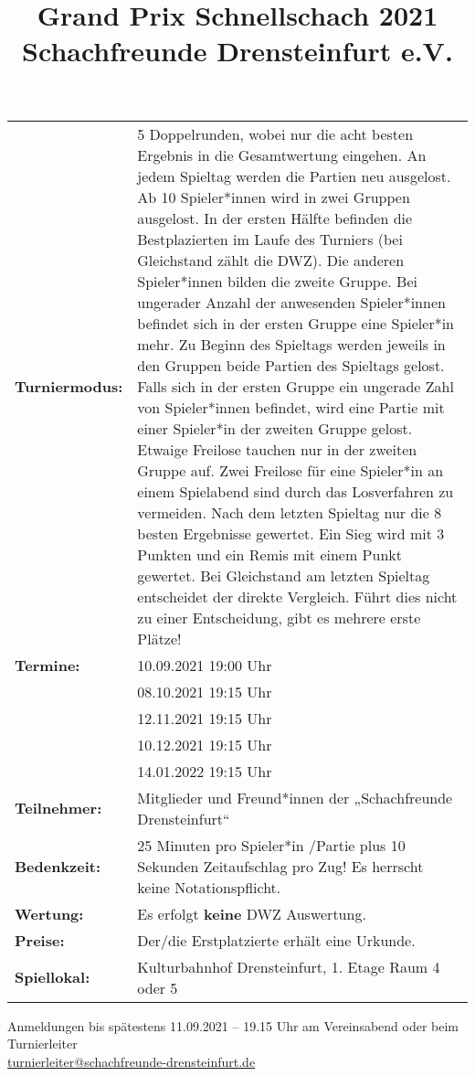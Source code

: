 \documentclass[a4paper,parskip=full-,DIV18]{scrartcl}
\title{Grand Prix Schnellschach 2021 \\Schachfreunde Drensteinfurt e.V.}
\date{}
\begin{document}
\maketitle


\begin{tabular}{p{3 cm} p{13.5 cm}}
	\textbf{Turniermodus:} & 5 Doppelrunden, wobei nur die acht besten Ergebnis in die Gesamtwertung eingehen. An jedem Spieltag werden die Partien neu ausgelost. Ab 10 Spieler*innen wird in zwei Gruppen ausgelost. In der ersten Hälfte befinden die Bestplazierten im Laufe des Turniers (bei Gleichstand zählt die DWZ). Die anderen Spieler*innen bilden die zweite Gruppe. Bei ungerader Anzahl der anwesenden Spieler*innen befindet sich in der ersten Gruppe eine Spieler*in mehr. Zu Beginn des Spieltags werden jeweils in den Gruppen beide Partien des Spieltags gelost. Falls sich in der ersten Gruppe ein ungerade Zahl von Spieler*innen befindet, wird eine Partie mit einer Spieler*in der zweiten Gruppe gelost. Etwaige Freilose tauchen nur in der zweiten Gruppe auf. Zwei Freilose für eine Spieler*in an einem Spielabend sind durch das Losverfahren zu vermeiden. Nach dem letzten Spieltag nur die 8 besten Ergebnisse gewertet. Ein Sieg wird mit 3 Punkten und ein Remis mit einem Punkt gewertet. Bei Gleichstand am letzten Spieltag entscheidet der direkte Vergleich. Führt dies nicht zu einer Entscheidung, gibt es mehrere erste Plätze!      \\
	\textbf{Termine:}      & 10.09.2021 19:00 Uhr \\
	                       & 08.10.2021 19:15 Uhr \\
	                       & 12.11.2021 19:15 Uhr \\
	                       & 10.12.2021 19:15 Uhr \\
	                       & 14.01.2022 19:15 Uhr \\
	\textbf{Teilnehmer:}   & Mitglieder und Freund*innen der „Schachfreunde Drensteinfurt“  \\
	\textbf{Bedenkzeit:}   & 25 Minuten pro Spieler*in /Partie plus 10 Sekunden Zeitaufschlag pro Zug! Es herrscht keine Notationspflicht. \\
	\textbf{Wertung:}      & Es erfolgt \textbf{keine} DWZ Auswertung.                                                  \\
	\textbf{Preise:}       & Der/die Erstplatzierte erhält eine Urkunde. \\
	\textbf{Spiellokal:}   & Kulturbahnhof Drensteinfurt, 1. Etage Raum 4 oder 5
\end{tabular}


\bigskip

Anmeldungen bis spätestens 11.09.2021 – 19.15 Uhr am Vereinsabend oder beim Turnierleiter \\ \href{mailto:turnierleiter@schachfreunde-drensteinfurt.de}{turnierleiter@schachfreunde-drensteinfurt.de}
\end{document}
